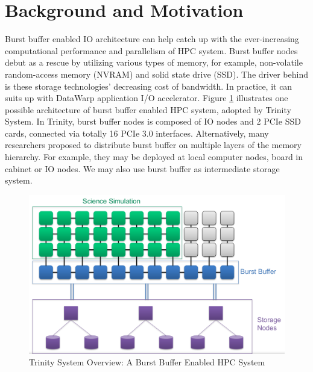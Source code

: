 \section{Background and Motivation}
\label{Sec:Background}
Burst buffer enabled IO architecture can help catch up with
the ever-increasing computational performance and parallelism of HPC system.
Burst buffer nodes debut as a rescue by utilizing various types of memory,
for example, non-volatile random-access memory (NVRAM) and solid state drive (SSD).
The driver behind is these storage technologies' decreasing cost of bandwidth.
In practice, it can suits up with DataWarp application I/O accelerator\cite{DataWarp}.
Figure \ref{Fig:BBArchitecture} illustrates one possible architecture of
burst buffer enabled HPC system, adopted by Trinity System\cite{TrinitySystem}.
In Trinity, burst buffer nodes is composed of IO nodes and 2 PCIe SSD cards,
connected via totally 16 PCIe 3.0 interfaces.
Alternatively, many researchers proposed to distribute burst buffer 
on multiple layers of the memory hierarchy\cite{Romanus:CORR:15}.
For example, they may be deployed at local computer nodes, board in cabinet or IO nodes.
We may also use burst buffer as intermediate storage system.

\begin{figure}[!t]
        \centering
        \includegraphics[width=6.6in]{BBArchitecture}
        \caption{Trinity System Overview: A Burst Buffer Enabled HPC System}
        \label{Fig:BBArchitecture}
\end{figure}

